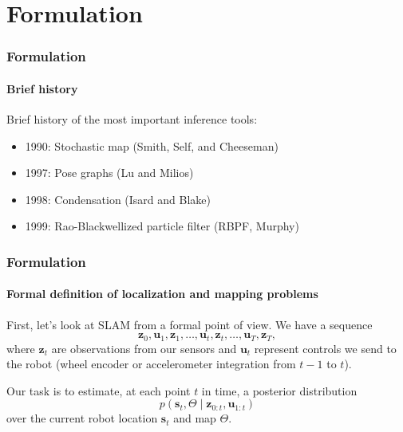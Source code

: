 \documentclass[aspectratio=169]{beamer}
\renewcommand{\vec}[1]{\boldsymbol{#1}}
\begin{document}
\section{Formulation}

\begin{frame}
\frametitle{Formulation}
\framesubtitle{Brief history}

Brief history of the most important inference tools:

\begin{itemize}
\item 1990: Stochastic map (Smith, Self, and Cheeseman)
\item 1997: Pose graphs (Lu and Milios)
\item 1998: Condensation (Isard and Blake)
\item 1999: Rao-Blackwellized particle filter (RBPF, Murphy)
\end{itemize}

\end{frame}


\begin{frame}
\frametitle{Formulation}
\framesubtitle{Formal definition of localization and mapping problems}

First, let's look at SLAM from a formal point of view.  We have a sequence
\begin{equation*}
\vec{z}_0,\vec{u}_1,\vec{z}_1,\ldots,\vec{u}_t,\vec{z}_t,\ldots,\vec{u}_T,
    \vec{z}_T,
\end{equation*}
where $\vec{z}_t$ are \alert{observations} from our sensors and
$\vec{u}_t$ represent \alert{controls} we send to the robot (wheel
encoder or accelerometer integration from $t-1$ to $t$).

\medskip

Our task is to estimate, at each point $t$ in time, a \alert{posterior
distribution}
\begin{equation*}
p(\vec{s}_t, \Theta \mid \vec{z}_{0:t}, \vec{u}_{1:t})
\end{equation*}
over the current robot \alert{location} $\vec{s}_t$ and \alert{map}
$\Theta$.

\end{frame}
\end{document}
